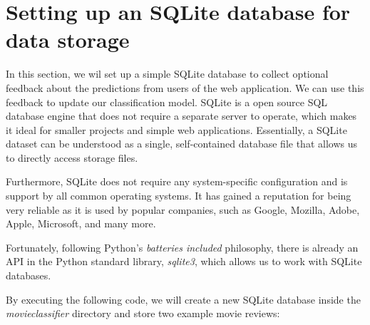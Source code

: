 \documentclass[11pt]{article}
\begin{document}
    \section{Setting up an SQLite database for data
storage}\label{setting-up-an-sqlite-database-for-data-storage}

    In this section, we wil set up a simple SQLite database to collect
optional feedback about the predictions from users of the web
application. We can use this feedback to update our classification
model. SQLite is a open source SQL database engine that does not require
a separate server to operate, which makes it ideal for smaller projects
and simple web applications. Essentially, a SQLite dataset can be
understood as a single, self-contained database file that allows us to
directly access storage files.

Furthermore, SQLite does not require any system-specific configuration
and is support by all common operating systems. It has gained a
reputation for being very reliable as it is used by popular companies,
such as Google, Mozilla, Adobe, Apple, Microsoft, and many more.

Fortunately, following Python's \emph{batteries included} philosophy,
there is already an API in the Python standard library, \emph{sqlite3},
which allows us to work with SQLite databases.

By executing the following code, we will create a new SQLite database
inside the \emph{movieclassifier} directory and store two example movie
reviews:
\end{document}
